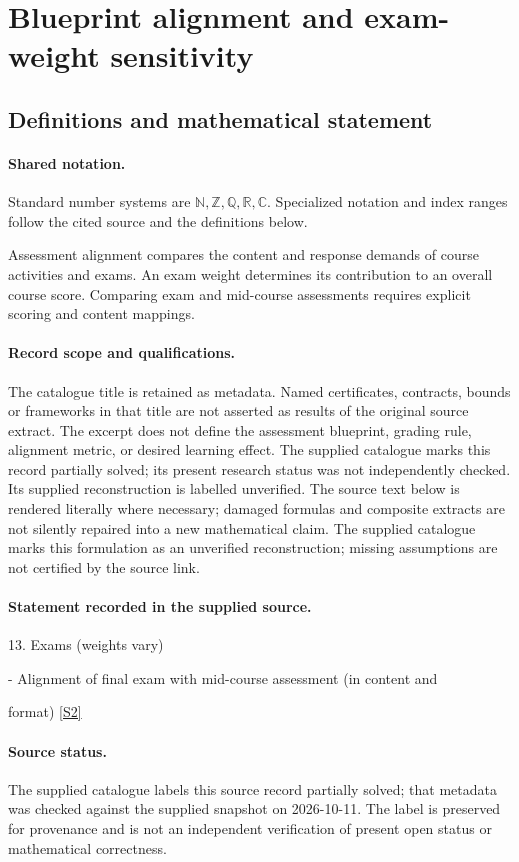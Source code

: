 \documentclass[11pt]{article}
\newcommand{\sref}[2]{\hyperlink{source:#1:#2}{[S#2]}}
\begin{document}
\section{Blueprint alignment and exam-weight sensitivity}\label{statement}

\subsection{Definitions and mathematical statement}

\paragraph{Shared notation.}Standard number systems are $\mathbb N,\mathbb Z,\mathbb Q,\mathbb R,\mathbb C$. Specialized notation and index ranges follow the cited source and the definitions below.


Assessment alignment compares the content and response demands of course activities and exams. An exam weight determines its contribution to an overall course score. Comparing exam and mid-course assessments requires explicit scoring and content mappings.
\paragraph{Record scope and qualifications.}
The catalogue title is retained as metadata. Named certificates, contracts, bounds or frameworks in that title are not asserted as results of the original source extract.
The excerpt does not define the assessment blueprint, grading rule, alignment metric, or desired learning effect. The supplied catalogue marks this record partially solved; its present research status was not independently checked. Its supplied reconstruction is labelled unverified.
The source text below is rendered literally where necessary; damaged formulas and composite extracts are not silently repaired into a new mathematical claim.
The supplied catalogue marks this formulation as an unverified reconstruction; missing assumptions are not certified by the source link.
\paragraph{Statement recorded in the supplied source.}
13. Exams (weights vary)

- Alignment of final exam with mid-course assessment (in content and

format) \sref{statement}{2}
\paragraph{Source status.}
The supplied catalogue labels this source record partially solved; that metadata was checked against the supplied snapshot on 2026-10-11. The label is preserved for provenance and is not an independent verification of present open status or mathematical correctness.
\end{document}
